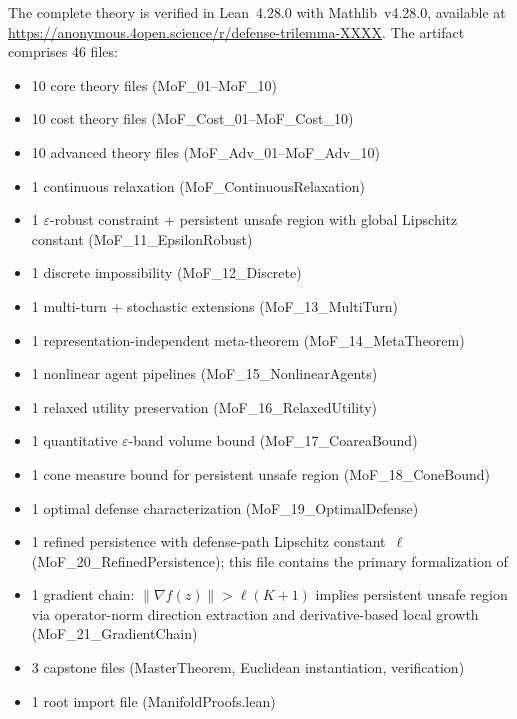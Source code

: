 \documentclass[11pt]{article}
\begin{document}
The complete theory is verified in Lean~4.28.0 with Mathlib~v4.28.0,
available at
\url{https://anonymous.4open.science/r/defense-trilemma-XXXX}.
The artifact comprises 46 files:
\begin{itemize}[nosep]
  \item 10 core theory files (MoF\_01--MoF\_10)
  \item 10 cost theory files (MoF\_Cost\_01--MoF\_Cost\_10)
  \item 10 advanced theory files (MoF\_Adv\_01--MoF\_Adv\_10)
  \item 1 continuous relaxation (MoF\_ContinuousRelaxation)
  \item 1 $\varepsilon$-robust constraint + persistent unsafe region
    with global Lipschitz constant
    (MoF\_11\_EpsilonRobust)
  \item 1 discrete impossibility (MoF\_12\_Discrete)
  \item 1 multi-turn + stochastic extensions
    (MoF\_13\_MultiTurn)
  \item 1 representation-independent meta-theorem
    (MoF\_14\_MetaTheorem)
  \item 1 nonlinear agent pipelines (MoF\_15\_NonlinearAgents)
  \item 1 relaxed utility preservation (MoF\_16\_RelaxedUtility)
  \item 1 quantitative $\varepsilon$-band volume bound
    (MoF\_17\_CoareaBound)
  \item 1 cone measure bound for persistent unsafe region
    (MoF\_18\_ConeBound)
  \item 1 optimal defense characterization
    (MoF\_19\_OptimalDefense)
  \item 1 refined persistence with defense-path Lipschitz constant~$\ell$
    (MoF\_20\_RefinedPersistence); this file contains the primary
    formalization of 
  \item 1 gradient chain: $\|\nabla f(z)\| > \ell(K+1)$ implies
    persistent unsafe region via operator-norm direction extraction
    and derivative-based local growth
    (MoF\_21\_GradientChain)
  \item 3 capstone files (MasterTheorem, Euclidean instantiation,
    verification)
  \item 1 root import file (ManifoldProofs.lean)
\end{itemize}


\end{document}
